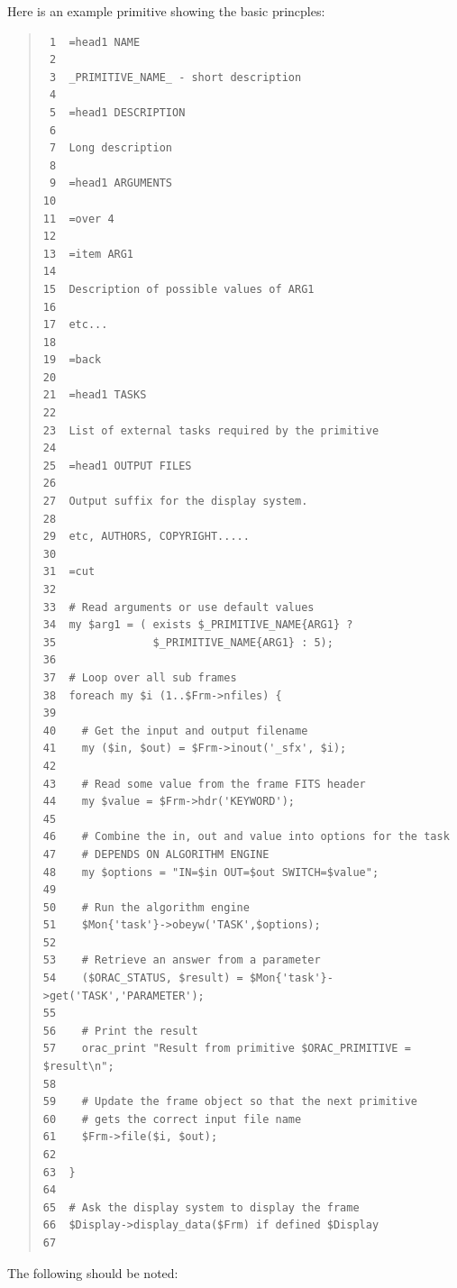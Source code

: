 \documentclass[twoside,11pt]{article}
\renewcommand{\_}{\texttt{\symbol{95}}}
\newenvironment{myquote}{\begin{quote}\begin{small}}{\end{small}\end{quote}}
\begin{document}
Here is an example primitive showing the basic princples:

\begin{myquote}
\begin{verbatim}
 1  =head1 NAME
 2
 3  _PRIMITIVE_NAME_ - short description
 4
 5  =head1 DESCRIPTION
 6 
 7  Long description
 8
 9  =head1 ARGUMENTS
10
11  =over 4
12
13  =item ARG1
14
15  Description of possible values of ARG1
16
17  etc...
18
19  =back
20
21  =head1 TASKS
22
23  List of external tasks required by the primitive
24
25  =head1 OUTPUT FILES
26
27  Output suffix for the display system.
28
29  etc, AUTHORS, COPYRIGHT.....
30
31  =cut
32
33  # Read arguments or use default values
34  my $arg1 = ( exists $_PRIMITIVE_NAME{ARG1} ? 
35               $_PRIMITIVE_NAME{ARG1} : 5);
36
37  # Loop over all sub frames
38  foreach my $i (1..$Frm->nfiles) {
39
40    # Get the input and output filename
41    my ($in, $out) = $Frm->inout('_sfx', $i);
42
43    # Read some value from the frame FITS header
44    my $value = $Frm->hdr('KEYWORD');
45
46    # Combine the in, out and value into options for the task
47    # DEPENDS ON ALGORITHM ENGINE
48    my $options = "IN=$in OUT=$out SWITCH=$value";
49
50    # Run the algorithm engine
51    $Mon{'task'}->obeyw('TASK',$options);
52
53    # Retrieve an answer from a parameter
54    ($ORAC_STATUS, $result) = $Mon{'task'}->get('TASK','PARAMETER');
55
56    # Print the result
57    orac_print "Result from primitive $ORAC_PRIMITIVE = $result\n";
58
59    # Update the frame object so that the next primitive
60    # gets the correct input file name
61    $Frm->file($i, $out);
62
63  }
64
65  # Ask the display system to display the frame
66  $Display->display_data($Frm) if defined $Display
67
\end{verbatim}
\end{myquote} %
The following should be noted:
\end{document}
